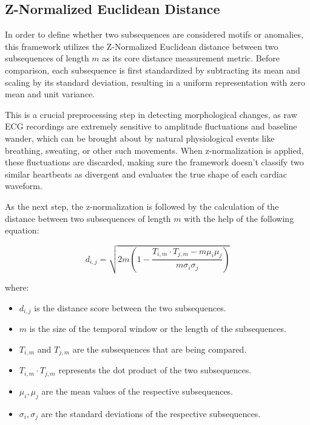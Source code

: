 \documentclass[conference,10pt]{IEEEtran}
\begin{document}
\subsection{Z-Normalized Euclidean Distance}

In order to define whether two subsequences are considered motifs or anomalies, this framework utilizes the Z-Normalized Euclidean distance between two subsequences of length $m$ as its core distance measurement metric. Before comparison, each subsequence is first standardized by subtracting its mean and scaling by its standard deviation, resulting in a uniform representation with zero mean and unit variance. 

This is a crucial preprocessing step in detecting morphological changes, as raw ECG recordings are extremely sensitive to amplitude fluctuations and baseline wander, which can be brought about by natural physiological events like breathing, sweating, or other such movements. When z-normalization is applied, these fluctuations are discarded, making sure the framework doesn’t classify two similar heartbeats as divergent and evaluates the true shape of each cardiac waveform. 

As the next step, the z-normalization is followed by the calculation of the distance between two subsequences of length $m$ with the help of the following equation: 

\begin{equation}
    d_{i,j} = \sqrt{2m \left( 1 - \frac{T_{i,m} \cdot T_{j,m} - m\mu_i\mu_j}{m\sigma_i\sigma_j} \right)}
\end{equation}


where:

\begin{itemize}
    \item $d_{i,j}$ is the distance score between the two subsequences.
    \item $m$ is the size of the temporal window or the length of the subsequences.
    \item $T_{i,m}$ and $T_{j,m}$ are the subsequences that are being compared.
    \item $T_{i,m} \cdot T_{j,m}$ represents the dot product of the two subsequences.
    \item $\mu_i, \mu_j$ are the mean values of the respective subsequences.
    \item $\sigma_i, \sigma_j$ are the standard deviations of the respective subsequences.
\end{itemize}
\end{document}
